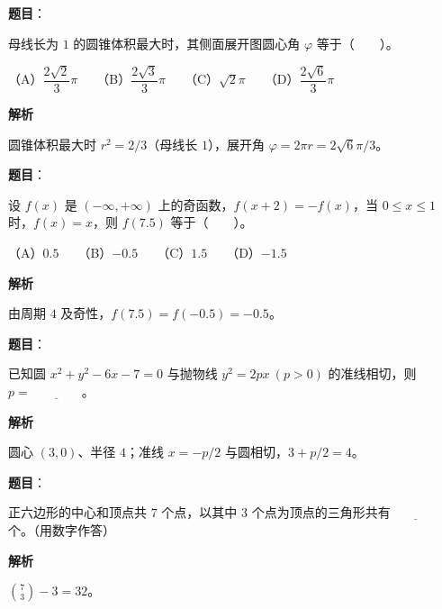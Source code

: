 \begin{answer}

\textbf{题目}：

母线长为 $1$ 的圆锥体积最大时，其侧面展开图圆心角 $\varphi$ 等于\mbox{（　　）}。

（A）$\dfrac{2\sqrt{2}}{3}\pi$　　（B）$\dfrac{2\sqrt{3}}{3}\pi$　　（C）$\sqrt{2}\pi$　　（D）$\dfrac{2\sqrt{6}}{3}\pi$

\textbf{解析}

圆锥体积最大时 $r^2=2/3$（母线长 $1$），展开角 $\varphi=2\pi r=2\sqrt6\pi/3$。


\end{answer}
\begin{answer}

\textbf{题目}：

设 $f(x)$ 是 $(-\infty,+\infty)$ 上的奇函数，$f(x+2)=-f(x)$，当 $0\le x\le1$ 时，$f(x)=x$，则 $f(7.5)$ 等于\mbox{（　　）}。

（A）$0.5$　　（B）$-0.5$　　（C）$1.5$　　（D）$-1.5$

\textbf{解析}

由周期 $4$ 及奇性，$f(7.5)=f(-0.5)=-0.5$。


\end{answer}
\begin{answer}

\textbf{题目}：

已知圆 $x^2+y^2-6x-7=0$ 与抛物线 $y^2=2px\ (p>0)$ 的准线相切，则 $p=\underline{\qquad\qquad}$。

\textbf{解析}

圆心 $(3,0)$、半径 $4$；准线 $x=-p/2$ 与圆相切，$3+p/2=4$。


\end{answer}
\begin{answer}

\textbf{题目}：

正六边形的中心和顶点共 $7$ 个点，以其中 $3$ 个点为顶点的三角形共有$\underline{\qquad\qquad}$个。（用数字作答）

\textbf{解析}

$\binom73-3=32$。


\end{answer}
